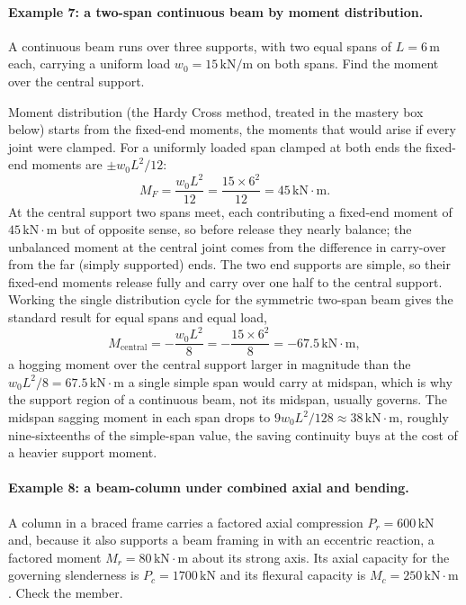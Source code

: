 \paragraph{Example 7: a two-span continuous beam by moment distribution.}
A continuous beam runs over three supports, with two equal spans of
$L = 6\,\si{\meter}$ each, carrying a uniform load $w_0 = 15\,\text{kN}/
\text{m}$ on both spans. Find the moment over the central support.

Moment distribution (the Hardy Cross method, treated in the mastery box
below) starts from the fixed-end moments, the moments that would arise
if every joint were clamped. For a uniformly loaded span clamped at both
ends the fixed-end moments are $\pm w_0 L^2/12$:
\[
M_F = \frac{w_0 L^2}{12} = \frac{15 \times 6^2}{12} = 45\,\text{kN}
\cdot\text{m}.
\]
At the central support two spans meet, each contributing a fixed-end
moment of $45\,\text{kN}\cdot\text{m}$ but of opposite sense, so before
release they nearly balance; the unbalanced moment at the central joint
comes from the difference in carry-over from the far (simply supported)
ends. The two end supports are simple, so their fixed-end moments
release fully and carry over one half to the central support. Working
the single distribution cycle for the symmetric two-span beam gives the
standard result for equal spans and equal load,
\[
M_{\text{central}} = -\frac{w_0 L^2}{8} = -\frac{15 \times 6^2}{8}
= -67.5\,\text{kN}\cdot\text{m},
\]
a hogging moment over the central support larger in magnitude than the
$w_0 L^2/8 = 67.5\,\text{kN}\cdot\text{m}$ a single simple span would
carry at midspan, which is why the support region of a continuous beam,
not its midspan, usually governs. The midspan sagging moment in each
span drops to $9 w_0 L^2/128 \approx 38\,\text{kN}\cdot\text{m}$,
roughly nine-sixteenths of the simple-span value, the saving continuity
buys at the cost of a heavier support moment.

\paragraph{Example 8: a beam-column under combined axial and bending.}
A column in a braced frame carries a factored axial compression $P_r =
600\,\text{kN}$ and, because it also supports a beam framing in with an
eccentric reaction, a factored moment $M_r = 80\,\text{kN}\cdot\text{m}$
about its strong axis. Its axial capacity for the governing slenderness
is $P_c = 1700\,\text{kN}$ and its flexural capacity is $M_c =
250\,\text{kN}\cdot\text{m}$. Check the member.


